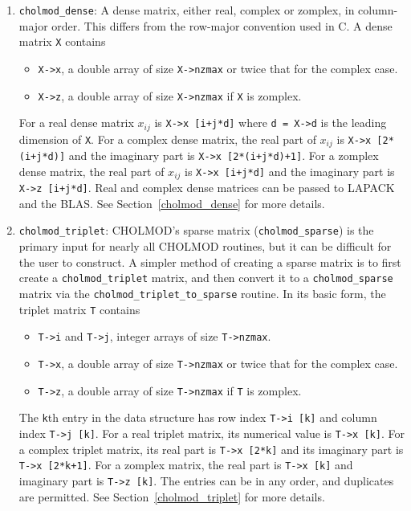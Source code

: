 \documentclass[11pt]{article}
\begin{document}
\begin{enumerate}
\item {\tt cholmod\_dense}:
    A dense matrix, either real, complex or zomplex, in column-major order.
    This differs from the row-major convention used in C.  A dense matrix {\tt X} contains
    \begin{itemize}
	\item {\tt X->x}, a double array of size {\tt X->nzmax} or twice that for the complex case.
	\item {\tt X->z}, a double array of size {\tt X->nzmax} if {\tt X} is zomplex.
    \end{itemize}
    For a real dense matrix $x_{ij}$ is {\tt X->x [i+j*d]} where {\tt d = X->d} is the leading dimension of {\tt X}.
    For a complex dense matrix, the real part of $x_{ij}$ is {\tt X->x [2*(i+j*d)]} and the imaginary part is {\tt X->x [2*(i+j*d)+1]}.
    For a zomplex dense matrix, the real part of $x_{ij}$ is {\tt X->x [i+j*d]} and the imaginary part is {\tt X->z [i+j*d]}.
    Real and complex dense matrices can be passed to LAPACK and the BLAS.
    See Section~\ref{cholmod_dense} for more details.

\item {\tt cholmod\_triplet}:
    CHOLMOD's sparse matrix ({\tt cholmod\_sparse}) is the primary input for nearly all CHOLMOD
    routines, but it can be difficult for the user to construct.
    A simpler method of creating a sparse matrix is to first create a {\tt cholmod\_triplet} matrix,
    and then convert it to a {\tt cholmod\_sparse} matrix via
    the {\tt cholmod\_triplet\_to\_sparse} routine.
    In its basic form, the triplet matrix {\tt T} contains
    \begin{itemize}
	\item {\tt T->i} and {\tt T->j}, integer arrays of size {\tt T->nzmax}.
	\item {\tt T->x}, a double array of size {\tt T->nzmax} or twice that for the complex case.
	\item {\tt T->z}, a double array of size {\tt T->nzmax} if {\tt T} is zomplex.
    \end{itemize}
    The {\tt k}th entry in the data structure has row index
    {\tt T->i [k]} and column index {\tt T->j [k]}.
    For a real triplet matrix, its numerical value is {\tt T->x [k]}.
    For a complex triplet matrix, its real part is {\tt T->x [2*k]} and its imaginary part is {\tt T->x [2*k+1]}.
    For a zomplex matrix, the real part is {\tt T->x [k]} and imaginary part is {\tt T->z [k]}.
    The entries can be in any order, and duplicates are permitted.
    See Section~\ref{cholmod_triplet} for more details.

\end{enumerate}
\end{document}
